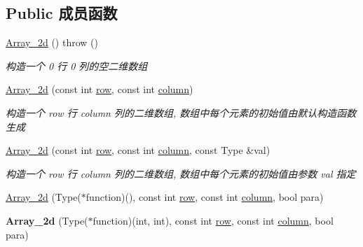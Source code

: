 \subsection*{Public 成员函数}
\begin{DoxyCompactItemize}
\item 
\hyperlink{classarray__2d_1_1_array__2d_a46091ff0390e83377efa1d2b9e9870d5}{Array\+\_\+2d} ()  throw ()
\begin{DoxyCompactList}\small\item\em 构造一个 0 行 0 列的空二维数组 \end{DoxyCompactList}\item 
\hyperlink{classarray__2d_1_1_array__2d_ae1230f7ac7f0558df988369c47ef78ba}{Array\+\_\+2d} (const int \hyperlink{classarray__2d_1_1_array__2d_a17b90b53a8e0002452e96c2b7f74820b}{row}, const int \hyperlink{classarray__2d_1_1_array__2d_abdf56a1c0f22088353d9a32de9680d76}{column})
\begin{DoxyCompactList}\small\item\em 构造一个 row 行 column 列的二维数组, 数组中每个元素的初始值由默认构造函数生成 \end{DoxyCompactList}\item 
\hyperlink{classarray__2d_1_1_array__2d_aae6ad90ad3b5f3549be4df81a8559ef6}{Array\+\_\+2d} (const int \hyperlink{classarray__2d_1_1_array__2d_a17b90b53a8e0002452e96c2b7f74820b}{row}, const int \hyperlink{classarray__2d_1_1_array__2d_abdf56a1c0f22088353d9a32de9680d76}{column}, const Type \&val)
\begin{DoxyCompactList}\small\item\em 构造一个 row 行 column 列的二维数组, 数组中每个元素的初始值由参数 val 指定 \end{DoxyCompactList}\item 
\hyperlink{classarray__2d_1_1_array__2d_ae7e62c74794fd2ccc4c3923cf0ae2e41}{Array\+\_\+2d} (Type($\ast$function)(), const int \hyperlink{classarray__2d_1_1_array__2d_a17b90b53a8e0002452e96c2b7f74820b}{row}, const int \hyperlink{classarray__2d_1_1_array__2d_abdf56a1c0f22088353d9a32de9680d76}{column}, bool para)
\item 
\mbox{\label{classarray__2d_1_1_array__2d_a5465e7ab30fa80206308a9a7c76571a7}} 
{\bfseries Array\+\_\+2d} (Type($\ast$function)(int, int), const int \hyperlink{classarray__2d_1_1_array__2d_a17b90b53a8e0002452e96c2b7f74820b}{row}, const int \hyperlink{classarray__2d_1_1_array__2d_abdf56a1c0f22088353d9a32de9680d76}{column}, bool para)

\end{DoxyCompactItemize}

